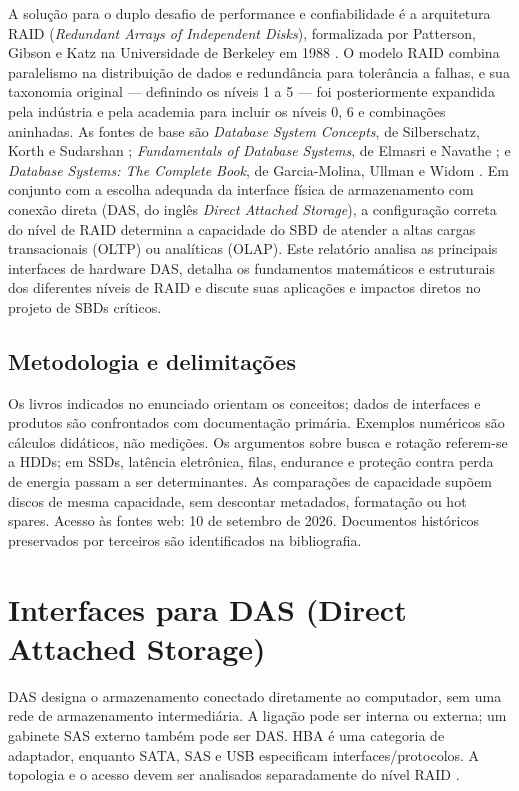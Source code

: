 \documentclass[titlepage]{article}
\begin{document}
A solução para o duplo desafio de performance e confiabilidade é a arquitetura RAID (\textit{Redundant Arrays of Independent Disks}), formalizada por Patterson, Gibson e Katz na Universidade de Berkeley em 1988 \cite{patterson1988}. O modelo RAID combina paralelismo na distribuição de dados e redundância para tolerância a falhas, e sua taxonomia original --- definindo os níveis 1 a 5 --- foi posteriormente expandida pela indústria e pela academia para incluir os níveis 0, 6 e combinações aninhadas. As fontes de base são \textit{Database System Concepts}, de Silberschatz, Korth e Sudarshan \cite{silberschatz2020}; \textit{Fundamentals of Database Systems}, de Elmasri e Navathe \cite{elmasri2016}; e \textit{Database Systems: The Complete Book}, de Garcia-Molina, Ullman e Widom \cite{garciamolina2009}. Em conjunto com a escolha adequada da interface física de armazenamento com conexão direta (DAS, do inglês \textit{Direct Attached Storage}), a configuração correta do nível de RAID determina a capacidade do SBD de atender a altas cargas transacionais (OLTP) ou analíticas (OLAP). Este relatório analisa as principais interfaces de hardware DAS, detalha os fundamentos matemáticos e estruturais dos diferentes níveis de RAID e discute suas aplicações e impactos diretos no projeto de SBDs críticos.

\subsection{Metodologia e delimitações}
Os livros indicados no enunciado orientam os conceitos; dados de interfaces e produtos são confrontados com documentação primária. Exemplos numéricos são cálculos didáticos, não medições. Os argumentos sobre busca e rotação referem-se a HDDs; em SSDs, latência eletrônica, filas, endurance e proteção contra perda de energia passam a ser determinantes. As comparações de capacidade supõem discos de mesma capacidade, sem descontar metadados, formatação ou hot spares. Acesso às fontes web: 10 de setembro de 2026. Documentos históricos preservados por terceiros são identificados na bibliografia.

\section{Interfaces para DAS (Direct Attached Storage)}
\label{sec:interfaces_das}
DAS designa o armazenamento conectado diretamente ao computador, sem uma rede de armazenamento intermediária. A ligação pode ser interna ou externa; um gabinete SAS externo também pode ser DAS. HBA é uma categoria de adaptador, enquanto SATA, SAS e USB especificam interfaces/protocolos. A topologia e o acesso devem ser analisados separadamente do nível RAID \cite{snia_dictionary}.
\end{document}
